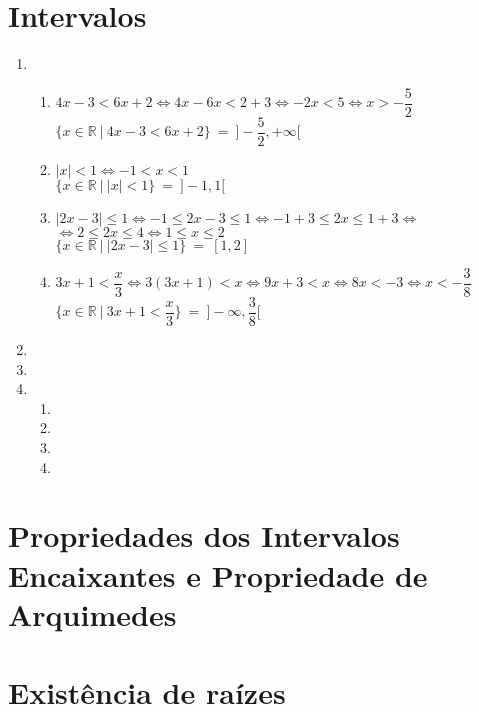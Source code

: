 \section{Intervalos}
\begin{enumerate}
\item %
	\begin{enumerate}
		\item %
		$4x - 3 < 6x + 2 \Leftrightarrow 4x -6x < 2+3 \Leftrightarrow -2x < 5 \Leftrightarrow x > -\dfrac{5}{2}$\\
		$\lbrace x \in \mathbb{R}\ |\ 4x-3<6x+2 \rbrace\ =\  ]-\dfrac{5}{2},+\infty [$
		\item %
		$\vert x \vert < 1 \Leftrightarrow -1 < x < 1$\\
		$\lbrace x \in \mathbb{R}\ |\ \vert x \vert < 1 \rbrace\ =\ ] -1, 1 [$
		\item %
		$\vert 2x - 3 \vert \leq 1 \Leftrightarrow -1 \leq 2x - 3 \leq 1 \Leftrightarrow -1+3 \leq 2x \leq 1 + 3 \Leftrightarrow$\\
		$\Leftrightarrow 2 \leq 2x \leq 4 \Leftrightarrow 1 \leq x \leq 2$\\
		$\lbrace x \in \mathbb{R}\ |\ \vert 2x -3 \vert \leq 1 \rbrace\ =\ [1,2]$
		\item %
		$3x+1<\dfrac{x}{3} \Leftrightarrow 3(3x+1)<x \Leftrightarrow 9x+3<x \Leftrightarrow  8x<-3\Leftrightarrow x<-\dfrac{3}{8}$\\
		$\lbrace x \in \mathbb{R}\ \vert\ 3x+1 < \dfrac{x}{3} \rbrace \ =\ ]-\infty,\dfrac{3}{8}[$
	\end{enumerate}
\item %

\item %
\item %
	\begin{enumerate}
		\item %
		\item %
		\item %
		\item %
	\end{enumerate}
\end{enumerate}

\section{Propriedades dos Intervalos Encaixantes e Propriedade de Arquimedes}
\section{Existência de raízes}